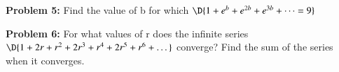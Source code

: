 \documentclass[11pt]{article}
\begin{document}
\vspace{0.2cm}

%

{\bf Problem 5:} Find the value of b for which $\D{1 + e^b + e^{2b} + e^{3b} + \dots = 9}$

\vspace{0.2cm}

{\bf Problem 6:} For what values of r does the infinite series $\D{1 + 2r + r^2 + 2r^3 + r^4 + 2r^5 + r^6 + \dots}$
converge? Find the sum of the series when it converges.

\vspace{0.2cm}

\end{document}
